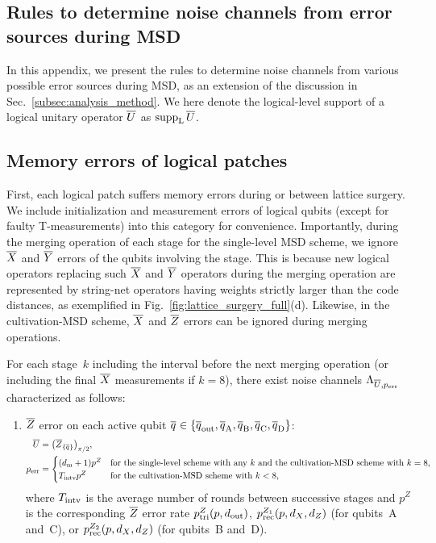 \documentclass[
 prx,
 reprint,
 superscriptaddress,
 longbibliography,
 dvipsnames
]{revtex4-2}
\begin{document}
\begin{widetext}

\section{Rules to determine noise channels from error sources during MSD \label{app:determining_noise_channels}}

In this appendix, we present the rules to determine noise channels from various possible error sources during MSD, as an extension of the discussion in Sec.~\ref{subsec:analysis_method}.
We here denote the logical-level support of a logical unitary operator $\overline{U}$ as $\operatorname{supp}_{\mathrm{L}} \overline{U}$.

\subsection{Memory errors of logical patches \label{subsec:memory_errors}}

First, each logical patch suffers memory errors during or between lattice surgery.
We include initialization and measurement errors of logical qubits (except for faulty T-measurements) into this category for convenience.
Importantly, during the merging operation of each stage for the single-level MSD scheme, we ignore $\overline{X}$ and $\overline{Y}$ errors of the qubits involving the stage.
This is because new logical operators replacing such $\overline{X}$ and $\overline{Y}$ operators during the merging operation are represented by string-net operators having weights strictly larger than the code distances, as exemplified in Fig.~\ref{fig:lattice_surgery_full}(d).
Likewise, in the cultivation-MSD scheme, $\overline{X}$ and $\overline{Z}$ errors can be ignored during merging operations.

For each stage~$k$ including the interval before the next merging operation (or including the final $\overline{X}$ measurements if $k=8$), there exist noise channels $\Lambda_{\overline{U}, p_{\mathrm{err}}}$ characterized as follows:
\begin{enumerate}
    \item $\overline{Z}$ error on each active qubit $\overline{q}_{\text{}} \in \qty{\overline{q}_{\text{out}}, \overline{q}_{\text{A}}, \overline{q}_{\text{B}}, \overline{q}_{\text{C}}, \overline{q}_{\text{D}}}$:
    \begin{align*}
        \overline{U} &= \qty(\overline{Z}_\qty{\overline{q}_{\text{}}})_{\pi/2}, \\
        p_{\mathrm{err}} &= \begin{cases}
            \qty(d_{\mathrm{m}} + 1)p^Z & \text{for the single-level scheme with any $k$ and the cultivation-MSD scheme with $k = 8$}, \\
            T_{\mathrm{intv}} p^Z & \text{for the cultivation-MSD scheme with $k < 8$},
        \end{cases}
    \end{align*}
    where $T_{\mathrm{intv}}$ is the average number of rounds between successive stages and $p^Z$ is the corresponding $\overline{Z}$ error rate $p_{\mathrm{tri}}^{Z}(p, d_{\mathrm{out}})$, $p_{\mathrm{rec}}^{Z_1}(p, {d_X}, {d_Z})$ (for qubits~A and~C), or $p_{\mathrm{rec}}^{Z_2}(p, {d_X}, {d_Z})$ (for qubits~B and~D).
    

\end{enumerate}
\end{widetext}
\end{document}

